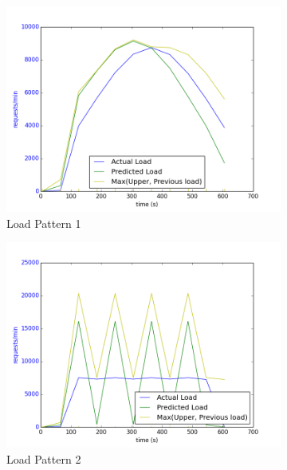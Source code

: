 \documentclass[12pt]{article}
\begin{document}
\begin{figure}[h!]
\centering
\begin{subfigure}{.6\textwidth}
\includegraphics[width=\textwidth]{Smart182predictedVsActual.png}
\caption{Load Pattern 1}
\end{subfigure}
\begin{subfigure}{.6\textwidth}
\includegraphics[width=\textwidth]{Smart282predictedVsActual.png}
\caption{Load Pattern 2}
\end{subfigure}
\begin{subfigure}{.6\textwidth}

\end{subfigure}
\end{figure}
\end{document}
